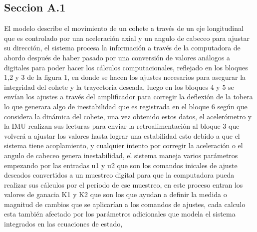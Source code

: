 \documentclass[article, 11pt]{IEEEtran}   %
\begin{document}
\subsection{Seccion A.1}
El modelo describe el movimiento de un cohete a través de un eje longitudinal que es controlado por una aceleración axial y un angulo de cabeceo para ajustar su dirección, el sistema procesa la información a través de la computadora de abordo después de haber pasado por una conversión de valores análogos a digitales para poder hacer los cálculos computacionales, reflejado en los bloques 1,2 y 3 de la figura 1, en donde se hacen los ajustes necesarios para asegurar la integridad del cohete y la trayectoria deseada, luego en los bloques 4 y 5 se envían los ajustes a través del amplificador para corregir la deflexión de la tobera lo que generara algo de inestabilidad que es registrada en el bloque 6 según que considera la dinámica del cohete, una vez obtenido estos datos, el acelerómetro y la IMU realizan sus lecturas para enviar la retroalimentación al bloque 3 que volverá a ajustar los valores hasta lograr una estabilidad esto debido a que el sistema tiene acoplamiento, y cualquier intento por corregir la aceleración o el angulo de cabeceo genera inestabilidad, el sistema maneja varios parámetros empezando por las entradas u1 y u2 que son los comandos inicales de ajuste deseados convertidos a un muestreo digital para que la computadora pueda realizar sus cálculos por el periodo de ese muestreo, en este proceso entran los valores de ganacia K1 y K2 que son los que ayudan a definir la medida o magnitud de cambios que se aplicarían a los comandos de ajustes, cada calculo esta también afectado por los parámetros adicionales que modela el sistema integrados en las ecuaciones de estado,
\end{document}
